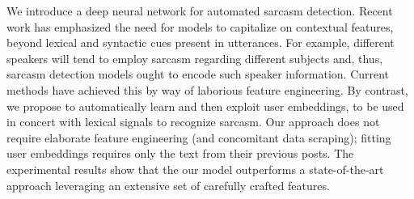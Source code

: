 We introduce a deep neural network for automated sarcasm detection. Recent work has emphasized the need for models to capitalize on contextual features, beyond lexical and syntactic cues present in utterances. For example, different speakers will tend to employ sarcasm regarding different subjects and, thus, sarcasm detection models ought to encode such speaker information. Current methods have achieved this by way of laborious feature engineering. By contrast, we propose to automatically learn and then exploit user embeddings, to be used in concert with lexical signals to recognize sarcasm. Our approach does not require elaborate feature engineering (and concomitant data scraping); fitting user embeddings requires only the text from their previous posts. The experimental results show that the our model outperforms a state-of-the-art approach leveraging an extensive set of carefully crafted features.
